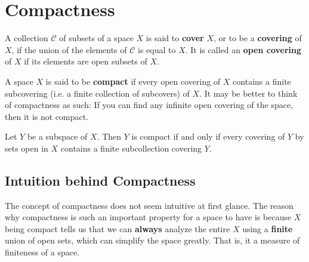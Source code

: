 \section{Compactness}

    \begin{definition}
    A collection $\mathscr{C}$ of subsets of a space $X$ is said to \textbf{cover} $X$, or to be a \textbf{covering} of $X$, if the union of the elements of $\mathscr{C}$ is equal to $X$. It is called an \textbf{open covering} of $X$ if its elements are open subsets of $X$. 
    \end{definition}

    \begin{definition}
    A space $X$ is said to be \textbf{compact} if every open covering of $X$ contains a finite subcovering (i.e. a finite collection of subcovers) of $X$. It may be better to think of compactness as such: If you can find any infinite open covering of the space, then it is not compact. 
    \end{definition}

    \begin{lemma}
    Let $Y$ be a subspace of $X$. Then $Y$ is compact if and only if every covering of $Y$ by sets open in $X$ contains a finite subcollection covering $Y$. 
    \end{lemma}

  \subsection{Intuition behind Compactness}

    The concept of compactness does not seem intuitive at first glance. The reason why compactness is such an important property for a space to have is because $X$ being compact tells us that we can \textbf{always} analyze the entire $X$ using a \textbf{finite} union of open sets, which can simplify the space greatly. That is, it a measure of finiteness of a space. 

